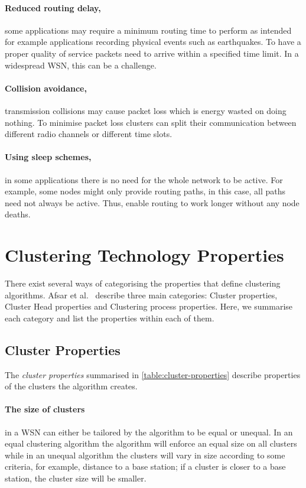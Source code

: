 \paragraph*{Reduced routing delay,} some applications may require a minimum routing time to perform as intended for example applications recording physical events such as earthquakes. To have a proper quality of service packets need to arrive within a specified time limit. In a widespread WSN, this can be a challenge.

\paragraph*{Collision avoidance,} transmission collisions may cause packet loss which is energy wasted on doing nothing. To minimise packet loss clusters can split their communication between different radio channels or different time slots.

\paragraph*{Using sleep schemes,} in some applications there is no need for the whole network to be active. For example, some nodes might only provide routing paths, in this case, all paths need not always be active. Thus, enable routing to work longer without any node deaths.


\section{Clustering Technology Properties}
\label{subsec:background:clustering-algorithm-categorisation}

There exist several ways of categorising the properties that define clustering algorithms. Afsar et al.~\cite{Afsar2014-clustering-survey} describe three main categories: Cluster properties, Cluster Head properties and Clustering process properties. Here, we summarise each category and list the properties within each of them.

\subsection{Cluster Properties}
The \textit{cluster properties} summarised in \cref{table:cluster-properties} describe properties of the clusters the algorithm creates.

\paragraph*{The size of clusters} in a WSN can either be tailored by the algorithm to be equal or unequal. In an equal clustering algorithm the algorithm will enforce an equal size on all clusters while in an unequal algorithm the clusters will vary in size according to some criteria, for example, distance to a base station; if a cluster is closer to a base station, the cluster size will be smaller.

